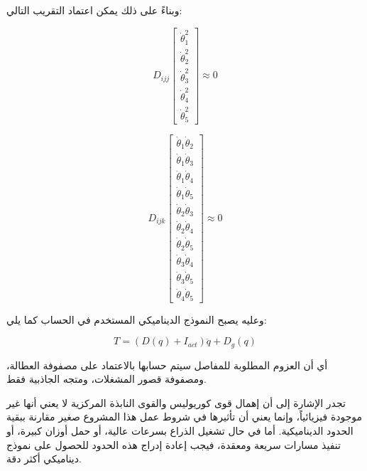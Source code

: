 وبناءً على ذلك يمكن اعتماد التقريب التالي:

\[
D_{ijj}
\begin{bmatrix}
\dot{\theta}_1^2 \\
\dot{\theta}_2^2 \\
\dot{\theta}_3^2 \\
\dot{\theta}_4^2 \\
\dot{\theta}_5^2
\end{bmatrix}
\approx
0
\]

\[
D_{ijk}
\begin{bmatrix}
\dot{\theta}_1\dot{\theta}_2 \\
\dot{\theta}_1\dot{\theta}_3 \\
\dot{\theta}_1\dot{\theta}_4 \\
\dot{\theta}_1\dot{\theta}_5 \\
\dot{\theta}_2\dot{\theta}_3 \\
\dot{\theta}_2\dot{\theta}_4 \\
\dot{\theta}_2\dot{\theta}_5 \\
\dot{\theta}_3\dot{\theta}_4 \\
\dot{\theta}_3\dot{\theta}_5 \\
\dot{\theta}_4\dot{\theta}_5
\end{bmatrix}
\approx
0
\]

وعليه يصبح النموذج الديناميكي المستخدم في الحساب كما يلي:

\[
T =
\left(D(q)+I_{act}\right)\ddot{q}
+
D_g(q)
\]

أي أن العزوم المطلوبة للمفاصل سيتم حسابها بالاعتماد على مصفوفة العطالة، ومصفوفة قصور المشغلات، ومتجه الجاذبية فقط.

تجدر الإشارة إلى أن إهمال قوى كوريوليس والقوى النابذة المركزية لا يعني أنها غير موجودة فيزيائياً، وإنما يعني أن تأثيرها في شروط عمل هذا المشروع صغير مقارنة ببقية الحدود الديناميكية. أما في حال تشغيل الذراع بسرعات عالية، أو حمل أوزان كبيرة، أو تنفيذ مسارات سريعة ومعقدة، فيجب إعادة إدراج هذه الحدود للحصول على نموذج ديناميكي أكثر دقة.